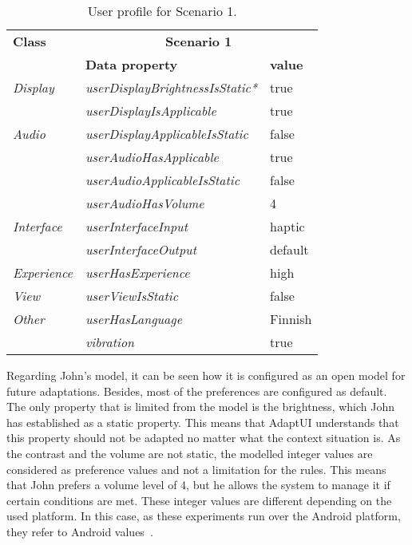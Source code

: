 \begin{table}
 \caption{User profile for Scenario 1.}
 \label{tbl:user_profile_scenario1}
 \footnotesize
 \centering
\begin{tabular}{l l l }
  \hline 
  \textbf{Class}  & \multicolumn{2}{c}{\textbf{Scenario 1}}		\\
		  & \textbf{Data property} & \textbf{value} 		\\
  \hline
  \textit{Display}& \textit{userDisplayBrightnessIsStatic*} & true	\\
		  & \textit{userDisplayIsApplicable}	    & true	\\
  \textit{Audio}  & \textit{userDisplayApplicableIsStatic}  & false	\\
		  & \textit{userAudioHasApplicable} 	    & true 	\\
		  & \textit{userAudioApplicableIsStatic}    & false 	\\
		  & \textit{userAudioHasVolume}  	    & 4 	\\
  \textit{Interface}& \textit{userInterfaceInput}	    & haptic	\\
		  & \textit{userInterfaceOutput} 	    & default	\\
  \textit{Experience}& \textit{userHasExperience} 	    & high	\\
  \textit{View}	  & \textit{userViewIsStatic}		    & false	\\
  \textit{Other}  & \textit{userHasLanguage}		    & Finnish	\\
		  & \textit{vibration} 			    & true 	\\
  \hline
\end{tabular}
\end{table}

Regarding John’s model, it can be seen how it is configured as an open model for
future adaptations. Besides, most of the preferences are configured as default. 
The only property that is limited from the model is the brightness, which John
has established as a static property. This means that AdaptUI understands that
this property should not be adapted no matter what the context situation is.
As the contrast and the volume are not static, the modelled integer values are
considered as preference values and not a limitation for the rules. This means
that John prefers a volume level of 4, but he allows the system to manage it if
certain conditions are met. These integer values are different depending on the
used platform. In this case, as these experiments run over the Android platform,
they refer to Android values~\citep{android_volume}. 

